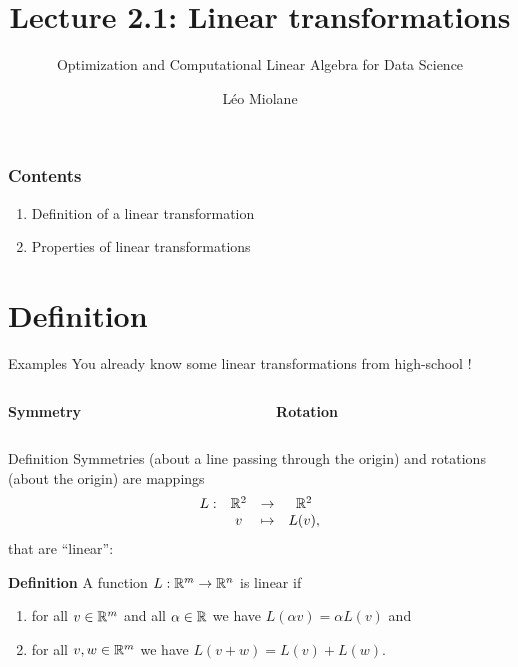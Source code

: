 \documentclass{beamer}
\title{Lecture 2.1: Linear transformations}
\subtitle{Optimization and Computational Linear Algebra for Data Science}
\author{Léo Miolane}
\date{}
\begin{document}
\setcounter{showProgressBar}{0}
\setcounter{showSlideNumbers}{0}

\frame{\titlepage}

\begin{frame}
	\frametitle{Contents}
	\begin{enumerate}
		\item Definition of a linear transformation
			\vspace{1cm}
		\item Properties of linear transformations
	\end{enumerate}
\end{frame}


\setcounter{framenumber}{0}
\setcounter{showSlideNumbers}{1}
\section{Definition}
\begin{frame}[t]{Examples}
	You already know some linear transformations from high-school !

	\vspace{0.6cm}
	\begin{columns}
		\begin{column}{0.47\textwidth}
			\vspace{-0.25cm}
			\begin{center}
				\textbf{Symmetry}
			\end{center}
			\vspace{5cm}
		\end{column}
		\vrule
		\vrule
		\begin{column}{0.53\textwidth}
			\vspace{-0.5cm}
			\begin{center}
				\textbf{Rotation}
				\vspace{5cm}
			\end{center}
		\end{column}
	\end{columns}


\end{frame}

\begin{frame}[t]{Definition}
	Symmetries (about a line passing through the origin) and rotations (about the origin) are mappings
	$$
	\begin{array}{cccc}
		L: & \mathbb{R}^2 & \to & \mathbb{R}^2 \\
		   & v & \mapsto & L(v),
	\end{array}
	$$
	that are ``linear'':
	\vspace{0.3cm}
	\begin{block}{\bf Definition}
		A function $L: \mathbb{R}^m \to \mathbb{R}^n$ is linear if
		\begin{enumerate}
			\item for all $v \in \mathbb{R}^m$ and all $\alpha \in \mathbb{R}$ we have $L(\alpha v) = \alpha L(v)$ and
			\item for all $v,w \in \mathbb{R}^m$ we have $L(v + w) = L(v) + L(w)$.
		\end{enumerate}
	\end{block}
\end{frame}
\end{document}
